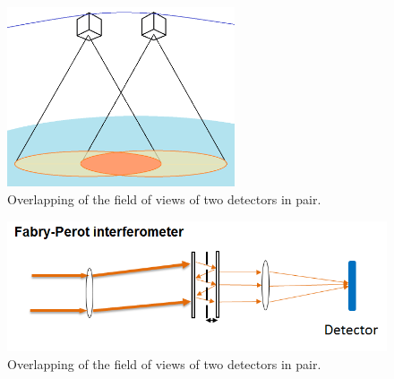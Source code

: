 \documentclass{scrartcl}
\begin{document}
\begin{figure}[hbpt]
\centering
\includegraphics[width=0.6\textwidth]{img/eng_fig_1}
\caption{Overlapping of the field of views of two detectors in pair.}
\end{figure}

\begin{figure}[hbpt]
\centering
\includegraphics[width=\textwidth]{img/eng_fig_2}
\caption{Overlapping of the field of views of two detectors in pair.}
\end{figure}


  
\end{document}
